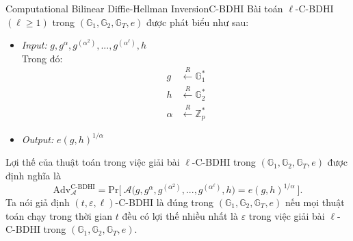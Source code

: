 \documentclass[class=report, crop=false]{standalone}
\begin{document}
		\begin{problem}{Computational Bilinear Diffie-Hellman Inversion}{C-BDHI}
			Bài toán $\ell$-C-BDHI $(\ell \geq 1)$ trong $(\mathbb{G}_1, \mathbb{G}_2, \mathbb{G}_T, e)$ được phát biểu như sau:
			\vspace{-\baselineskip}
			\begin{itemize}[leftmargin=1.5cm, itemindent=-0.5cm]
				\item[] \textit{Input:} $g, g^\alpha, g^{(\alpha^2)}, ..., g^{(\alpha^\ell)}, h$ \\
				Trong đó: \vspace{-\baselineskip}
				\begin{align*}
					g 		&\xleftarrow{R} \mathbb{G}_1^* \\
					h 		&\xleftarrow{R} \mathbb{G}_2^* \\
					\alpha 	&\xleftarrow{R} \mathbb{Z}_p^*
				\end{align*}
				\item[] \textit{Output:} $e(g, h)^{1/\alpha}$
			\end{itemize}
			\vspace{-\baselineskip}\par
			Lợi thế của thuật toán \algo trong việc giải bài $\ell$-C-BDHI trong $(\mathbb{G}_1, \mathbb{G}_2, \mathbb{G}_T, e)$ được định nghĩa là
			\[
				\text{Adv}_{\mathcal{A}}^{\text{C-BDHI}} = \text{Pr}\bigg[ \ \mathcal{A}\Big(g, g^\alpha, g^{(\alpha^2)}, ..., g^{(\alpha^\ell)}, h \Big) = e(g, h)^{1/\alpha} \ \bigg].
			\] \indent
			Ta nói giả định $(t, \varepsilon, \ell)$-C-BDHI là đúng trong $(\mathbb{G}_1, \mathbb{G}_2, \mathbb{G}_T, e)$ nếu mọi thuật toán chạy trong thời gian $t$ đều có lợi thế nhiều nhất là $\varepsilon$ trong việc giải bài $\ell$-C-BDHI trong $(\mathbb{G}_1, \mathbb{G}_2, \mathbb{G}_T, e)$.
		\end{problem}
\end{document}
